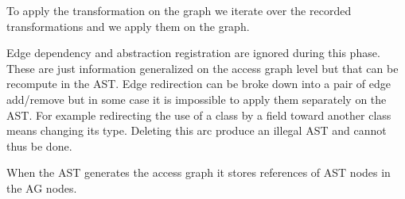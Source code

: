 \documentclass[]{article}
\begin{document}
To apply the transformation on the graph we iterate over the recorded transformations and we apply them on the graph.

Edge dependency and abstraction registration are ignored during this phase. These are just information generalized on the access graph level but that can be recompute in the AST.
Edge redirection can be broke down into a pair of edge add/remove but in some case it is impossible to apply them separately on the AST. For example redirecting the use of a class by a field toward another class means changing its type. Deleting this arc produce an illegal AST and cannot thus be done.

When the AST generates the access graph it stores references of AST nodes in the AG nodes.



\end{document}
